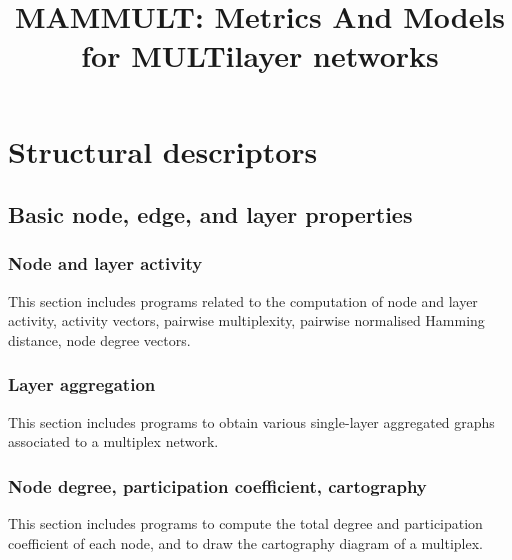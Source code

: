 \documentclass[a4paper,11pt]{book}
\title{MAMMULT: Metrics And Models for MULTilayer networks}
\begin{document}
\maketitle

\chapter{Structural descriptors}

\section{Basic node, edge, and layer properties}

\subsection{Node and layer activity}

This section includes programs related to the computation of node and
layer activity, activity vectors, pairwise multiplexity, pairwise
normalised Hamming distance, node degree vectors.











\subsection{Layer aggregation}

This section includes programs to obtain various single-layer
aggregated graphs associated to a multiplex network. 




\subsection{Node degree, participation coefficient, cartography}

This section includes programs to compute the total degree and
participation coefficient of each node, and to draw the cartography
diagram of a multiplex.
\end{document}
